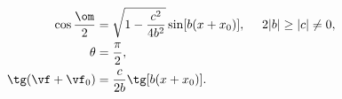 \begin{equation*}
\begin{split}
  \cos\frac\om2&=\sqrt{1-\frac{c^2}{4b^2}}\sin[b(x+x_0)],~~~~2|b|\ge|c|\ne0,
\\
  \theta&=\frac\pi2,
\\
  \tg(\vf+\vf_0)&=\frac c{2b}\tg[b(x+x_0)].
\end{split}
\end{equation*}

